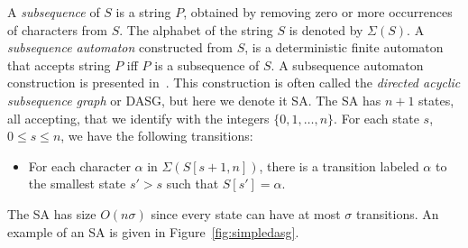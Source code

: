 \documentclass[a4paper,11pt]{article}
\begin{document}
A \emph{subsequence} of $S$ is a string $P$, obtained by removing zero or more occurrences of characters from $S$. The alphabet of the string $S$ is denoted by $\Sigma(S)$.
A \emph{subsequence automaton} constructed from $S$, is a deterministic finite automaton that accepts string $P$ iff $P$ is a subsequence of $S$. A subsequence automaton construction is presented in~\cite{BaezaYates1991}. This construction is often called the \emph{directed acyclic subsequence graph} or DASG, but here we denote it SA.
The SA has $n+1$ states, all accepting, that we identify with the integers $\{0,1, \ldots, n\}$.
For each state $s$, $0 \leq s \leq n$, we have the following transitions:
\begin{itemize}
\item For each character $\alpha$ in $\Sigma(S[s + 1, n])$, there is a transition labeled $\alpha$ to the smallest state $s' > s$ such that $S[s']= \alpha$.
\end{itemize}
The SA has size $O(n\sigma)$ since every state can have at most $\sigma$ transitions.
An example of an SA is given in Figure~\ref{fig:simpledasg}.
\end{document}
